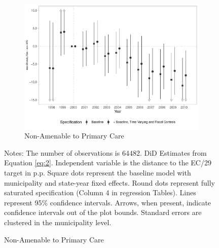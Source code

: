 \begin{figure}[h!]
\begin{center}
    \begin{subfigure}{0.32\textwidth}
        \centering
        \caption{\scriptsize Non-Amenable to Primary Care}\label{fig:15c}
        \includegraphics[width=\textwidth]{plots/tx_mi_nicsap_dist_ec29_baseline_dist_ec29_baseline_15.pdf}
    \end{subfigure}
    
    \end{center}
    
        \scriptsize{Notes: The number of observations is 64482. DiD Estimates from Equation \ref{eq:2}. Independent variable is the distance to the EC/29 target in p.p. Square dots represent the baseline model with municipality and state-year fixed effects. Round dots represent fully saturated specification (Column 4 in regression Tables). Lines represent 95\% confidence intervals. Arrows, when present, indicate confidence intervals out of the plot bounds. Standard errors are clustered in the municipality level.}
    
\end{figure}